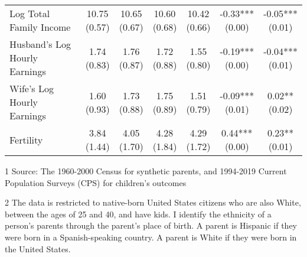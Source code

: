 \begin{table}[H]
{\begin{threeparttable}
\begin{tabular}[t]{>{\raggedright\arraybackslash}p{5cm}cccccc}
Log Total Family Income & \specialcell{10.75\\(0.57)} & \specialcell{10.65\\(0.67)} & \specialcell{10.60\\(0.68)} & \specialcell{10.42\\(0.66)} & \specialcell{-0.33***\\(0.00)} & \specialcell{-0.05***\\(0.01)}\\
Husband's Log Hourly Earnings & \specialcell{1.74\\(0.83)} & \specialcell{1.76\\(0.87)} & \specialcell{1.72\\(0.88)} & \specialcell{1.55\\(0.80)} & \specialcell{-0.19***\\(0.00)} & \specialcell{-0.04***\\(0.01)}\\
\addlinespace
Wife's Log Hourly Earnings & \specialcell{1.60\\(0.93)} & \specialcell{1.73\\(0.88)} & \specialcell{1.75\\(0.89)} & \specialcell{1.51\\(0.79)} & \specialcell{-0.09***\\(0.01)} & \specialcell{0.02**\\(0.02)}\\
Fertility & \specialcell{3.84\\(1.44)} & \specialcell{4.05\\(1.70)} & \specialcell{4.28\\(1.84)} & \specialcell{4.29\\(1.72)} & \specialcell{0.44***\\(0.00)} & \specialcell{0.23**\\(0.01)}\\
\bottomrule
\end{tabular}
\begin{tablenotes}
\item[1] Source: The 1960-2000 Census for synthetic parents, and 1994-2019 Current Population Surveys (CPS) for children's outcomes
\item[2] The data is restricted to native-born United States citizens who are also White, between the ages of 25 and 40, and have kids. I identify the ethnicity of a person's parents through the parent's place of birth. A parent is Hispanic if they were born in a Spanish-speaking country. A parent is White if they were born in the United States.
\end{tablenotes}
\end{threeparttable}}
\end{table}
